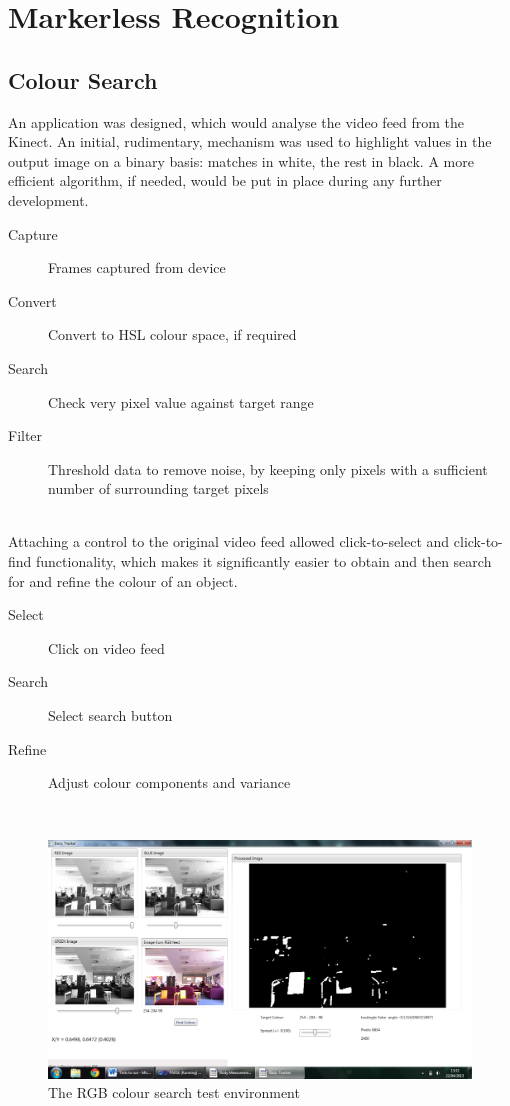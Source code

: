 \section{Markerless Recognition}

\subsection{Colour Search}
An application was designed, which would analyse the video feed from the Kinect. An initial, rudimentary, mechanism was used to highlight values in the output image on a binary basis: matches in white, the rest in black. A more efficient algorithm, if needed, would be put in place during any further development.\\
 
\begin{description}
\item[Capture] Frames captured from device
\item[Convert] Convert to HSL colour space, if required
\item[Search] Check very pixel value against target range
\item[Filter] Threshold data to remove noise, by keeping only pixels with a sufficient number of surrounding target pixels
\end{description} \\
 
Attaching a control to the original video feed allowed click-to-select and click-to-find functionality, which makes it significantly easier to obtain and then search for and refine the colour of an object.\\

\begin{description}
\item[Select] Click on video feed
\item[Search] Select search button
\item[Refine] Adjust colour components and variance
\end{description} \\

\begin{figure}
\begin{center}
\includegraphics[scale=0.2]{zscreenshots/screenshot_testing_rgb_orange}
\caption{The RGB colour search test environment}
\end{center}
\end{figure} \\

